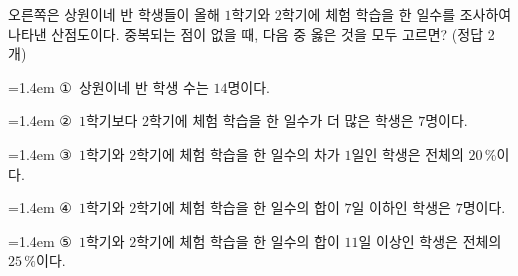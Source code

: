 \noindent\begin{minipage}[t]{0.58\linewidth}\vspace{0pt}\raggedright 오른쪽은 상원이네 반 학생들이 올해 $1$학기와 $2$학기에 체험 학습을 한 일수를 조사하여 나타낸 산점도이다. 중복되는 점이 없을 때, 다음 중 옳은 것을 모두 고르면? (정답 2개)\end{minipage}\hfill\begin{minipage}[t]{0.4\linewidth}\vspace{0pt}\centering \resizebox{\ifdim\width>\linewidth\linewidth\else\width\fi}{!}{}\end{minipage}\par
\par\medskip\par\noindent\hangindent=1.4em {\small ①}\ 상원이네 반 학생 수는 $14$명이다.\par\noindent\hangindent=1.4em {\small ②}\ $1$학기보다 $2$학기에 체험 학습을 한 일수가 더 많은 학생은 $7$명이다.\par\noindent\hangindent=1.4em {\small ③}\ $1$학기와 $2$학기에 체험 학습을 한 일수의 차가 $1$일인 학생은 전체의 $20\,\%$이다.\par\noindent\hangindent=1.4em {\small ④}\ $1$학기와 $2$학기에 체험 학습을 한 일수의 합이 $7$일 이하인 학생은 $7$명이다.\par\noindent\hangindent=1.4em {\small ⑤}\ $1$학기와 $2$학기에 체험 학습을 한 일수의 합이 $11$일 이상인 학생은 전체의 $25\,\%$이다.\par\medskip
